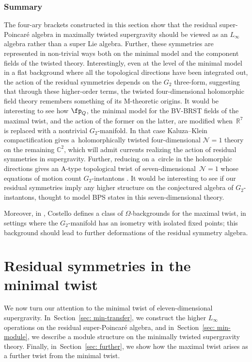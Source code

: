 \documentclass[10pt,a4paper]{amsart}
\numberwithin{equation}{section}
\theoremstyle{definition}
\def\R{\mathbb{R}}
\def\C{\mathbb{C}}
\begin{document}
\subsubsection{Summary}
The four-ary brackets constructed in this section show that the residual super-Poincar\'e algebra in maximally twisted supergravity should be viewed as an $L_\infty$ algebra rather than a super Lie algebra. Further, these symmetries are represented in non-trivial ways both on the minimal model and the component fields of the twisted theory. Interestingly, even at the level of the minimal model in a flat background where all the topological directions have been integrated out, the action of the residual symmetries depends on the $G_2$ three-form, suggesting that through these higher-order terms, the twisted four-dimensional holomorphic field theory remembers something of its M-theoretic origins. It would be interesting to see how $\fp_Q$, the minimal model for the BV-BRST fields of the maximal twist, and the action of the former on the latter, are modified when~$\R^7$ is replaced with a nontrivial $G_2$-manifold. In that case Kaluza--Klein compactification gives a~holomorphically twisted four-dimensional $\mathcal{N}=1$ theory on the remaining $\C^2$, which will admit currents realizing the action of residual symmetries in supergravity. Further, reducing on a~circle in the holomorphic directions gives an A-type topological twist of seven-dimensional~${\mathcal{N}=1}$ whose equations of motion count $G_2$-instantons \cite{EvidenceG2}. It would be interesting to see if our residual symmetries imply any higher structure on the conjectured algebra of $G_2$-instantons, thought to model BPS states in this seven-dimensional theory.


Moreover, in \cite{CostelloMtheory2}, Costello defines a class of $\Omega$-backgrounds for the maximal twist, in settings where the $G_2$-manifold has an isometry with isolated fixed points; this background should lead to further deformations of the residual symmetry algebra.


\section{Residual symmetries in the minimal twist} \label{sec: min}
We now turn our attention to the minimal twist of eleven-dimensional supergravity. In~Section~\ref{sec: min-transfer}, we construct the higher $L_\infty$ operations on the residual super-Poincar\'e algebra, and in~Section~\ref{sec: min-module}, we describe a module structure on the minimally twisted supergravity theory. Finally, in~Section~\ref{sec: further}, we show how the maximal twist arises as a further twist from the minimal twist.
\end{document}
